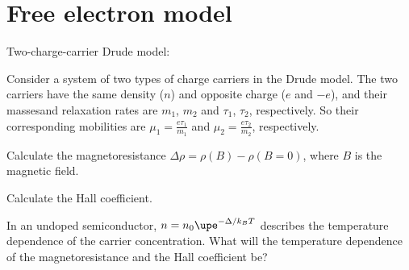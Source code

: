 
\section{Free electron model}

\begin{problem}
  Two-charge-carrier Drude model:

  Consider a system of two types of charge carriers in the Drude model.
  The two carriers have the same density ($n$)
  and opposite charge ($e$ and $-e$),
  and their massesand relaxation rates are $m_1$, $m_2$ and $\tau_1$, $\tau_2$,
  respectively.
  So their corresponding mobilities are $\mu_1 = \frac{e\tau_1}{m_1}$ and
  $\mu_2 = \frac{e\tau_2}{m_2}$, respectively.
  \begin{enumext}[label = (\alph*)]
    \item Calculate the magnetoresistance $\Delta \rho = \rho(B) - \rho(B = 0)$,
    where $B$ is the magnetic field.
    \item Calculate the Hall coefficient.
    \item In an undoped semiconductor, $n = n_0 \upe^{-\Delta/k_BT}$
    describes the temperature dependence of the carrier concentration.
    What will the temperature dependence of the magnetoresistance
    and the Hall coefficient be?
  \end{enumext}
\end{problem}
